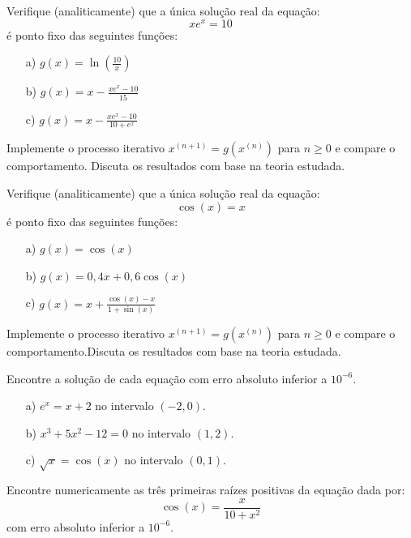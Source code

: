 \begin{Exercise} Verifique (analiticamente) que a única solução real da equação:
  \begin{equation*}
    xe^x=10
  \end{equation*}
é ponto fixo das seguintes funções:
\begin{itemize}
\item[a)] $g(x)=\ln\left(\frac{10}{x}\right)$
\item[b)] $g(x)=x-\frac{xe^{x}-10}{15}$
\item[c)] $g(x)=x-\frac{xe^{x}-10}{10+e^{x}}$
\end{itemize}
Implemente o processo iterativo $x^{(n+1)}=g(x^{(n)})$ para $n\geq 0$ e compare o comportamento. Discuta os resultados com base na teoria estudada.
\end{Exercise}

\begin{Exercise} Verifique (analiticamente) que a única solução real da equação:
  \begin{equation*}
    \cos(x)=x  
  \end{equation*}
é ponto fixo das seguintes funções:
\begin{itemize}
\item[a)] $g(x)=\cos(x)$
\item[b)] $g(x)=0,4 x+ 0,6\cos(x)$
\item[c)] $g(x)=x+\frac{\cos(x)-x}{1+\sin(x)}$
\end{itemize}
Implemente o processo iterativo $x^{(n+1)}=g(x^{(n)})$ para $n\geq 0$ e compare o comportamento.Discuta os resultados com base na teoria estudada.
\end{Exercise}


\begin{Exercise} Encontre a solução de cada equação com erro absoluto inferior a $10^{-6}$.
  \begin{itemize}
  \item[a)] $e^x=x+2$ no intervalo $(-2,0)$.
  \item[b)] $x^3+5x^2-12=0$ no intervalo $(1,2)$.
  \item[c)] $\sqrt{x}=\cos(x)$ no intervalo $(0,1)$.
  \end{itemize}
\end{Exercise}

\begin{Exercise} Encontre numericamente as três primeiras raízes positivas da equação dada por:
  \begin{equation*}
    \cos(x)=\frac{x}{10+x^2}  
  \end{equation*}
com erro absoluto inferior a $10^{-6}$.
\end{Exercise}

